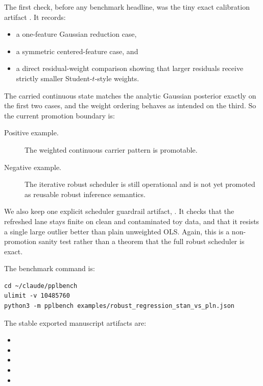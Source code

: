 \documentclass[11pt,openany]{report}
\begin{document}
The first check, before any benchmark headline, was the tiny exact calibration
artifact .
It records:
\begin{itemize}
\item a one-feature Gaussian reduction case,
\item a symmetric centered-feature case, and
\item a direct residual-weight comparison showing that larger residuals receive
strictly smaller Student-\(t\)-style weights.
\end{itemize}
The carried continuous state matches the analytic Gaussian posterior exactly on
the first two cases, and the weight ordering behaves as intended on the third.
So the current promotion boundary is:
\begin{description}
\item[Positive example.] The weighted continuous carrier pattern is promotable.
\item[Negative example.] The iterative robust scheduler is still operational and
is not yet promoted as reusable robust inference semantics.
\end{description}

We also keep one explicit scheduler guardrail artifact,
.  It
checks that the refreshed lane stays finite on clean and contaminated toy data,
and that it resists a single large outlier better than plain unweighted OLS.
Again, this is a non-promotion sanity test rather than a theorem that the full
robust scheduler is exact.

The benchmark command is:
\begin{lstlisting}
cd ~/claude/pplbench
ulimit -v 10485760
python3 -m pplbench examples/robust_regression_stan_vs_pln.json
\end{lstlisting}

The stable exported manuscript artifacts are:
\begin{itemize}
\item {}
\item {}
\item {}
\item {}
\item {}
\end{itemize}
\end{document}
